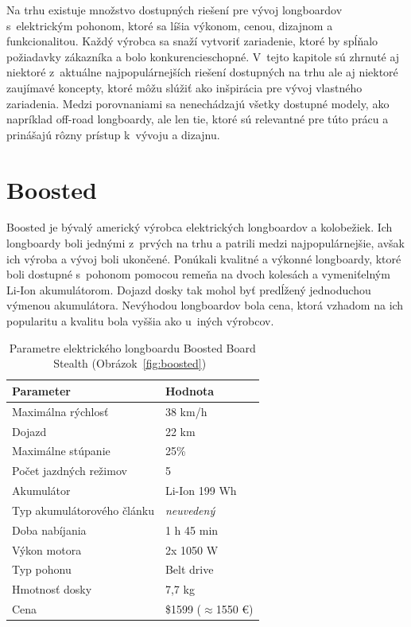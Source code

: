 Na trhu existuje množstvo dostupných riešení pre vývoj longboardov s~elektrickým pohonom, ktoré sa líšia výkonom, cenou, dizajnom a funkcionalitou.
Každý výrobca sa snaží vytvoriť zariadenie, ktoré by spĺňalo požiadavky zákazníka a bolo konkurencieschopné.
V~tejto kapitole sú zhrnuté aj niektoré z~aktuálne najpopulárnejších riešení dostupných na trhu ale aj niektoré zaujímavé koncepty, ktoré môžu slúžiť ako inšpirácia pre vývoj vlastného zariadenia.\cite{Gell}
Medzi porovnaniami sa nenechádzajú všetky dostupné modely, ako napríklad off-road longboardy, ale len tie, ktoré sú relevantné pre túto prácu a prinášajú rôzny prístup k~vývoju a dizajnu.

\newpage

\section{Boosted}
Boosted je bývalý americký výrobca elektrických longboardov a kolobežiek.
Ich longboardy boli jednými z~prvých na trhu a patrili medzi najpopulárnejšie, avšak ich výroba a vývoj boli ukončené.
Ponúkali kvalitné a výkonné longboardy, ktoré boli dostupné s~pohonom pomocou remeňa na dvoch kolesách a vymeniťelným Li-Ion akumulátorom.
Dojazd dosky tak mohol byť predĺžený jednoduchou výmenou akumulátora.
Nevýhodou longboardov bola cena, ktorá vzhadom na ich popularitu a kvalitu bola vyššia ako u~iných výrobcov.\cite{Boosted} 

\begin{table}[h]
    \centering
    \begin{tabular}{|l|l|}
        \hline
        \textbf{Parameter} & \textbf{Hodnota} \\ \hline
        Maximálna rýchlosť & 38 km/h \\ \hline
        Dojazd & 22 km \\ \hline
        Maximálne stúpanie & 25\% \\ \hline
        Počet jazdných režimov & 5 \\ \hline
        Akumulátor & Li-Ion 199 Wh \\ \hline
        Typ akumulátorového článku & \it{neuvedený} \\ \hline
        Doba nabíjania & 1 h 45 min \\ \hline
        Výkon motora & 2x 1050 W \\ \hline
        Typ pohonu & Belt drive \\ \hline
        Hmotnosť dosky & 7,7 kg \\ \hline
        Cena & \$1599 ($\approx$1550 €) \\ \hline
    \end{tabular}
    \caption{Parametre elektrického longboardu Boosted Board Stealth (Obrázok~\ref{fig:boosted})~\cite{Boosted}}\label{tab:boosted}
\end{table}

